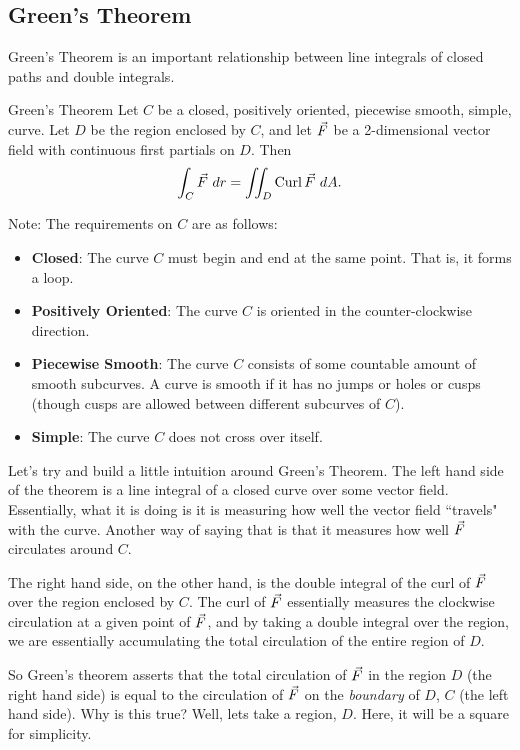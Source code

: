 \subsection{Green's Theorem}

Green's Theorem is an important relationship between line integrals of closed paths and double integrals.

\begin{theorem}{Green's Theorem}
Let $C$ be a closed, positively oriented, piecewise smooth, simple, curve. Let $D$ be the region enclosed by $C$, and let $\vec{F}$ be a 2-dimensional vector field with continuous first partials on $D$. Then $$\int_C \vcF \ dr=\iint_D\curl \vcF\ dA.$$
\end{theorem}

Note: The requirements on $C$ are as follows:
\begin{itemize}
\item \textbf{Closed}: The curve $C$ must begin and end at the same point. That is, it forms a loop.
\item \textbf{Positively Oriented}: The curve $C$ is oriented in the counter-clockwise direction.
\item \textbf{Piecewise Smooth}: The curve $C$ consists of some countable amount of smooth subcurves. A curve is smooth if it has no jumps or holes or cusps (though cusps are allowed between different subcurves of $C$).
\item \textbf{Simple}: The curve $C$ does not cross over itself.
\end{itemize}

Let's try and build a little intuition around Green's Theorem. The left hand side of the theorem is a line integral of a closed curve over some vector field. Essentially, what it is doing is it is measuring how well the vector field ``travels" with the curve. Another way of saying that is that it measures how well $\vec{F}$ circulates around $C$. 

The right hand side, on the other hand, is the double integral of the curl of $\vec{F}$ over the region enclosed by $C$. The curl of $\vec{F}$ essentially measures the clockwise circulation at a given point of $\vec{F}$, and by taking a double integral over the region, we are essentially accumulating the total circulation of the entire region of $D$.

So Green's theorem asserts that the total circulation of $\vec{F}$ in the region $D$ (the right hand side) is equal to the circulation of $\vec{F}$ on the \textit{boundary} of $D$, $C$ (the left hand side). Why is this true? Well, lets take a region, $D$. Here, it will be a square for simplicity.

